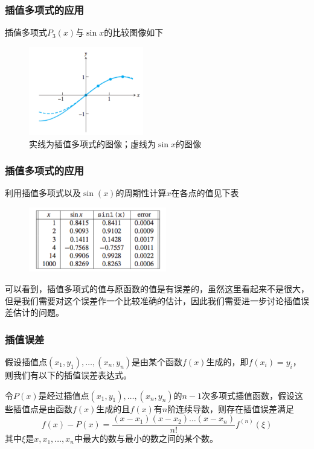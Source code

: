 \documentclass[10pt]{beamer}
\begin{document}
\begin{frame}
\frametitle{插值多项式的应用}
插值多项式$P_3(x)$与$\sin x$的比较图像如下
\begin{figure}
\includegraphics[width=5cm]{figs/3-1-5_sin-3} 
\caption{实线为插值多项式的图像；虚线为$\sin x$的图像} 
\end{figure}
\end{frame}


\begin{frame}
\frametitle{插值多项式的应用}
利用插值多项式以及$\sin (x)$的周期性计算$x$在各点的值见下表
\begin{figure}
\includegraphics[width=6cm]{figs/3-1-5_sin-4} 
\end{figure}
可以看到，插值多项式的值与原函数的值是有误差的，虽然这里看起来不是很大，但是我们需要对这个误差作一个比较准确的估计，因此我们需要进一步讨论插值误差估计的问题。
\end{frame}


\begin{frame}
\frametitle{插值误差}
假设插值点$(x_1, y_1), \ldots, (x_n,y_n)$是由某个函数$f(x)$生成的，即$f(x_i) = y_i$，则我们有以下的插值误差表达式。

\begin{theorem}[插值误差]
\label{thm: interp error}
令$P(x)$是经过插值点$(x_1, y_1), \ldots, (x_n,y_n)$的$n-1$次多项式插值函数，假设这些插值点是由函数$f(x)$生成的且$f(x)$有$n$阶连续导数，则存在插值误差满足
\begin{equation}
f(x) - P(x) = \frac{(x - x_1)(x - x_2) \ldots (x-x_n)}{n!}f^{(n)}(\xi)
\end{equation}
其中$\xi$是$x, x_1, \ldots, x_n$中最大的数与最小的数之间的某个数。
\end{theorem}
\end{frame}
\end{document}
